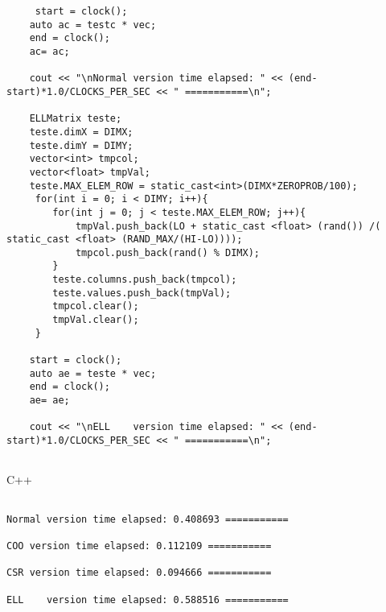 \begin{verbatim}
     start = clock();
    auto ac = testc * vec;
    end = clock();
    ac= ac;
    
    cout << "\nNormal version time elapsed: " << (end-start)*1.0/CLOCKS_PER_SEC << " ===========\n";

    ELLMatrix teste;
    teste.dimX = DIMX;
    teste.dimY = DIMY;
    vector<int> tmpcol;
    vector<float> tmpVal;
    teste.MAX_ELEM_ROW = static_cast<int>(DIMX*ZEROPROB/100);
     for(int i = 0; i < DIMY; i++){
        for(int j = 0; j < teste.MAX_ELEM_ROW; j++){
            tmpVal.push_back(LO + static_cast <float> (rand()) /( static_cast <float> (RAND_MAX/(HI-LO))));
            tmpcol.push_back(rand() % DIMX);
        }
        teste.columns.push_back(tmpcol);
        teste.values.push_back(tmpVal);
        tmpcol.clear();
        tmpVal.clear();
     }

    start = clock();
    auto ae = teste * vec;
    end = clock();
    ae= ae;
    
    cout << "\nELL    version time elapsed: " << (end-start)*1.0/CLOCKS_PER_SEC << " ===========\n";


\end{verbatim}{C++}

\begin{lstlisting}
    
Normal version time elapsed: 0.408693 ===========

COO version time elapsed: 0.112109 ===========

CSR version time elapsed: 0.094666 ===========

ELL    version time elapsed: 0.588516 ===========

\end{lstlisting}